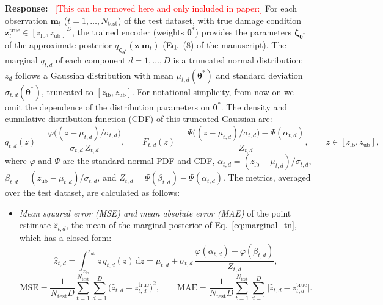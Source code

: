 \documentclass[11pt]{article}
\newenvironment{response}{\par\smallskip\noindent\color{resp}\textbf{Response:}\ }{\par}
\newcommand{\m}{\mathbf{m}}
\newcommand{\z}{\mathbf{z}}
\begin{document}
\begin{response}
\textcolor{red}{[This can be removed here and only included in paper:]} For each observation $\m_t$ ($t=1,\dots,N_{\text{test}}$) of the test dataset, with true damage condition
$\z^{\text{true}}_t\in[z_{\text{lb}},z_{\text{ub}}]^{D}$, the trained encoder (weights $\bm{\theta}^{*}$) provides the parameters $\bm\zeta_{\bm{\theta}^{*}}$ of the approximate posterior $q_{\bm\zeta_{\bm{\theta}^{*}}}(\z|\m_t)$ (Eq.~(8) of the manuscript). The marginal $q_{t,d}$ of each component $d=1,\dots,D$ is a truncated normal distribution: $z_d$ follows a Gaussian distribution with mean $\mu_{t,d}(\bm{\theta}^{*})$ and standard deviation $\sigma_{t,d}(\bm{\theta}^{*})$, truncated to $[z_{\text{lb}},z_{\text{ub}}]$. 
For notational simplicity, from now on we omit the dependence of the distribution parameters on $\bm{\theta}^{*}$. 
The density and cumulative distribution function
(CDF) of this truncated Gaussian are:
\begin{equation}
	q_{t,d}(z)=\frac{\varphi\big((z-\mu_{t,d})/\sigma_{t,d}\big)}{\sigma_{t,d}\,Z_{t,d}},\qquad
	F_{t,d}(z)=\frac{\Psi\big((z-\mu_{t,d})/\sigma_{t,d}\big)-\Psi(\alpha_{t,d})}{Z_{t,d}},\qquad
	z\in[z_{\text{lb}},z_{\text{ub}}],
	\label{eq:marginal_tn}
\end{equation}
where $\varphi$ and $\Psi$ are the standard normal PDF and CDF, $\alpha_{t,d}=(z_{\text{lb}}-\mu_{t,d})/\sigma_{t,d}$,
$\beta_{t,d}=(z_{\text{ub}}-\mu_{t,d})/\sigma_{t,d}$, and $Z_{t,d}=\Psi(\beta_{t,d})-\Psi(\alpha_{t,d})$. %
The metrics, averaged over the test dataset, are calculated as follows:
\begin{itemize}[leftmargin=*]
	\item \emph{Mean squared error (MSE) and mean absolute error (MAE)} of the point estimate $\hat z_{t,d}$, the mean of
	the marginal posterior of Eq.~\eqref{eq:marginal_tn}, which has a closed form:
	\begin{equation*}
		\hat z_{t,d}=\int_{z_{\text{lb}}}^{z_{\text{ub}}} z\,q_{t,d}(z)\,\mathrm{d}z
		=\mu_{t,d}+\sigma_{t,d}\,\frac{\varphi(\alpha_{t,d})-\varphi(\beta_{t,d})}{Z_{t,d}},
	\end{equation*}
	\begin{equation}
		\mathrm{MSE}=\frac{1}{N_{\text{test}}D}\sum_{t=1}^{N_{\text{test}}}\sum_{d=1}^{D}\big(\hat z_{t,d}-z^{\text{true}}_{t,d}\big)^2,\qquad
		\mathrm{MAE}=\frac{1}{N_{\text{test}}D}\sum_{t=1}^{N_{\text{test}}}\sum_{d=1}^{D}\big|\hat z_{t,d}-z^{\text{true}}_{t,d}\big|.
		\label{eq:mse_mae}

\end{equation}
\end{itemize}
\end{response}
\end{document}
